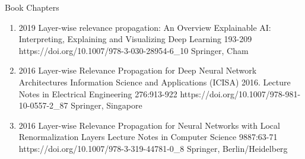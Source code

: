 \documentclass[10pt,a4paper]{article} %
\begin{document}
\clearpage
\headedsection %
{Book Chapters}{}
{
    \begin{enumerate}
        \item[] 
                            {2019}
                            {Layer-wise relevance propagation: An Overview}
                            {Explainable AI: Interpreting, Explaining and Visualizing Deep Learning}
                            {193-209}
                            {https://doi.org/10.1007/978-3-030-28954-6_10}
                            {Springer, Cham}

        \item[] 
                            {2016}
                            {Layer-wise Relevance Propagation for Deep Neural Network Architectures}
                            {Information Science and Applications (ICISA) 2016. Lecture Notes in Electrical Engineering}
                            {276:913-922}
                            {https://doi.org/10.1007/978-981-10-0557-2_87}
                            {Springer, Singapore}

        \item[] 
                            {2016}
                            {Layer-wise Relevance Propagation for Neural Networks with Local Renormalization Layers}
                            {Lecture Notes in Computer Science}
                            {9887:63-71}
                            {https://doi.org/10.1007/978-3-319-44781-0_8}
                            {Springer, Berlin/Heidelberg}
    \end{enumerate}

}
\end{document}
